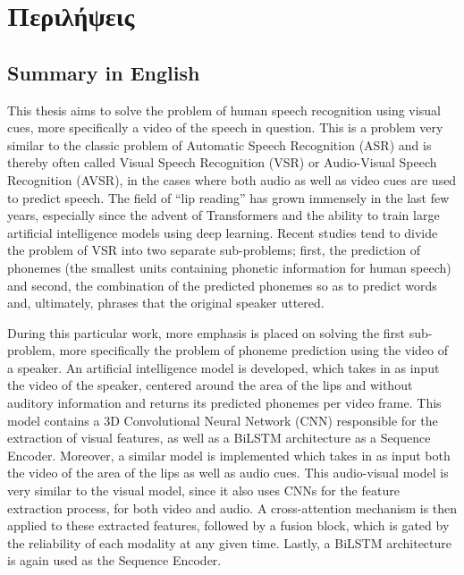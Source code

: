 \section{Περιλήψεις}
\label{Summaries}
\subsection{Summary in English}

This thesis aims to solve the problem of human speech recognition using visual cues, more specifically a video of the speech in question. This is a problem very similar to the classic problem of Automatic Speech Recognition (ASR) and is thereby often called Visual Speech Recognition (VSR) or Audio-Visual Speech Recognition (AVSR), in the cases where both audio as well as video cues are used to predict speech. The field of ``lip reading'' has grown immensely in the last few years, especially since the advent of Transformers and the ability to train large artificial intelligence models using deep learning. Recent studies tend to divide the problem of VSR into two separate sub-problems; first, the prediction of phonemes (the smallest units containing phonetic information for human speech) and second, the combination of the predicted phonemes so as to predict words and, ultimately, phrases that the original speaker uttered.

During this particular work, more emphasis is placed on solving the first sub-problem, more specifically the problem of phoneme prediction using the video of a speaker. An artificial intelligence model is developed, which takes in as input the video of the speaker, centered around the area of the lips and without auditory information and returns its predicted phonemes per video frame. This model contains a 3D Convolutional Neural Network (CNN) responsible for the extraction of visual features, as well as a BiLSTM architecture as a Sequence Encoder. Moreover, a similar model is implemented which takes in as input both the video of the area of the lips as well as audio cues. This audio-visual model is very similar to the visual model, since it also uses CNNs for the feature extraction process, for both video and audio. A cross-attention mechanism is then applied to these extracted features, followed by a fusion block, which is gated by the reliability of each modality at any given time. Lastly, a BiLSTM architecture is again used as the Sequence Encoder.


